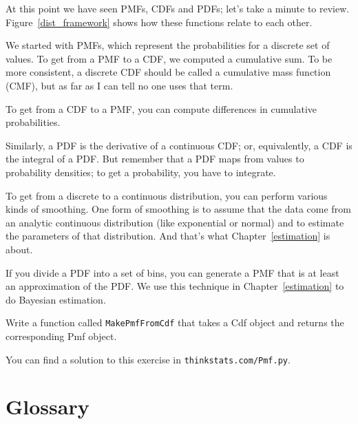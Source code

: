 \documentclass[12pt]{book}
\begin{document}
At this point we have seen PMFs, CDFs and PDFs; let's take a minute
to review.  Figure~\ref{dist_framework} shows how these functions relate
to each other.

We started with PMFs, which represent the probabilities for a discrete
set of values.  To get from a PMF to a CDF, we computed a cumulative sum.
To be more consistent, a discrete CDF should be called a cumulative mass
function (CMF), but as far as I can tell no one uses that term.

To get from a CDF to a PMF, you can compute differences in cumulative
probabilities.

Similarly, a PDF is the derivative of a continuous CDF; or, equivalently,
a CDF is the integral of a PDF.  But remember that a PDF maps from
values to probability densities; to get a probability, you have to
integrate.

To get from a discrete to a continuous distribution, you can perform
various kinds of smoothing.  One form of smoothing is to assume that
the data come from an analytic continuous distribution
(like exponential or normal) and to estimate the parameters of that
distribution.  And that's what Chapter~\ref{estimation} is about.

If you divide a PDF into a set of bins, you can generate a PMF that is
at least an approximation of the PDF.  We use this
technique in Chapter~\ref{estimation} to do Bayesian estimation.

\begin{exercise}
Write a function called {\tt MakePmfFromCdf} that takes a Cdf object
and returns the corresponding Pmf object.

You can find a solution to this exercise in {\tt thinkstats.com/Pmf.py}.

\end{exercise}

\section{Glossary}
\end{document}
